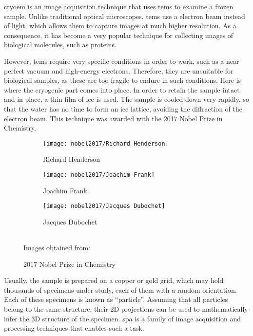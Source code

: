 \documentclass[../main.tex]{subfiles}
\begin{document}
\gls{cryoem} is an image acquisition technique that uses \glspl{tem} to examine a frozen sample. Unlike traditional optical microscopes, \glspl{tem} use a electron beam instead of light, which allows them to capture images at much higher resolution. As a consequence, it has become a very popular technique for collecting images of biological molecules, such as proteins\cite{chemistry_world_cryoem}.

However, \glspl{tem} require very specific conditions in order to work, such as a near perfect vacuum and high-energy electrons. Therefore, they are unsuitable for biological samples, as these are too fragile to endure in such conditions. Here is where the cryogenic part comes into place. In order to retain the sample intact and in place, a thin film of ice is used. The sample is cooled down very rapidly, so that the water has no time to form an ice lattice, avoiding the diffraction of the electron beam. This technique was awarded with the 2017 Nobel Prize in Chemistry\cite{chemistry_world_cryoem}.

\begin{figure}[htbp]
    \centering
    \begin{subfigure}[b]{0.3\textwidth}
         \centering
         \texttt{[image: nobel2017/Richard Henderson]}
         \caption{Richard Henderson}
         \label{fig:1:nobel2017:richard}
    \end{subfigure}
    \hfill
    \begin{subfigure}[b]{0.3\textwidth}
         \centering
         \texttt{[image: nobel2017/Joachim Frank]}
         \caption{Joachim Frank}
         \label{fig:1:nobel2017:joachim}
    \end{subfigure}
    \hfill
    \begin{subfigure}[b]{0.3\textwidth}
         \centering
         \texttt{[image: nobel2017/Jacques Dubochet]}
         \caption{Jacques Dubochet}
         \label{fig:1:nobel2017:jaques}
    \end{subfigure}\\
    Images obtained from: \cite{science_nobel}
    \caption{2017 Nobel Prize in Chemistry}
    \label{fig:1:nobel2017}
\end{figure}

Usually, the sample is prepared on a copper or gold grid, which may hold thousands of specimens under study, each of them with a random orientation. Each of these specimens is known as ``particle''. Assuming that all particles belong to the same structure, their 2D projections can be used to mathematically infer the 3D structure of the specimen\cite{cryoem101}. \Gls{spa} is a family of image acquisition and processing techniques that enables such a task.
\end{document}
